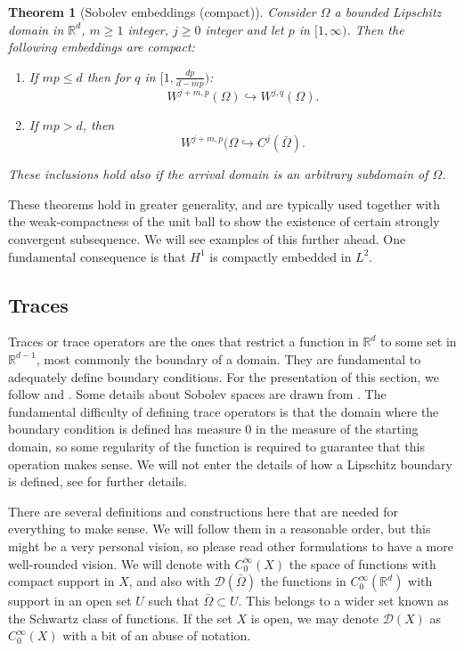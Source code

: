 \documentclass{article}
\newcommand{\R}{\mathbb{R}}
\newcommand{\D}{\mathcal{D}}
\newtheorem{theorem}{Theorem}
\begin{document}
\begin{theorem}[Sobolev embeddings (compact)]
Consider $\Omega$ a bounded Lipschitz domain in $\R^d$, $m\geq 1$ integer, $j\geq 0$ integer and let $p$ in $[1,\infty)$. Then the following embeddings are compact:
    \begin{enumerate}
        \item If $mp \leq d$  then for $q$ in $[1, \frac{dp}{d - mp})$:
            $$ W^{j+m, p}(\Omega) \hookrightarrow W^{j,q}(\Omega). $$
        \item If $mp > d$, then 
            $$ W^{j+m, p}(\Omega \hookrightarrow C^j(\bar\Omega). $$
    \end{enumerate}
These inclusions hold also if the arrival domain is an arbitrary subdomain of $\Omega$. 
\end{theorem}
These theorems hold in greater generality, and are typically used together with the weak-compactness of the unit ball to show the existence of certain strongly convergent subsequence. We will see examples of this further ahead. One fundamental consequence is that $H^1$ is compactly embedded in $L^2$.

\subsection{Traces}%

Traces or trace operators are the ones that restrict a function in $\R^d$ to some set in $\R^{d-1}$, most commonly the boundary of a domain. They are fundamental to adequately define boundary conditions. For the presentation of this section, we follow \cite{gatica2014simple} and \cite{monk2003finite}. Some details about Sobolev spaces are drawn from \cite{adams2003sobolev}. The fundamental difficulty of defining trace operators is that the domain where the boundary condition is defined has measure 0 in the measure of the starting domain, so some regularity of the function is required to guarantee that this operation makes sense. We will not enter the details of how a Lipschitz boundary is defined, see \cite{monk2003finite} for further details.

There are several definitions and constructions here that are needed for everything to make sense. We will follow them in a reasonable order, but this might be a very personal vision, so please read other formulations to have a more well-rounded vision. We will denote with $C_0^\infty(X)$ the space of functions with compact support in $X$, and also with $\D(\bar\Omega)$ the functions in $C_0^\infty(\R^d)$ with support in an open set $U$ such that $\bar\Omega\subset U$. This belongs to a wider set known as the Schwartz class of functions. If the set $X$ is open, we may denote $\D(X)$ as $C_0^\infty(X)$ with a bit of an abuse of notation.
\end{document}
